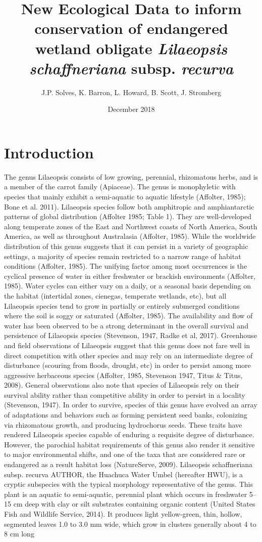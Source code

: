 \documentclass[twocolumn]{article}
\title{New Ecological Data to inform conservation of endangered wetland obligate \textit{Lilaeopsis schaffneriana} subsp. \textit{recurva}}
\author{J.P. Solves, K. Barron, L. Howard, B. Scott, J. Stromberg}
\date{December 2018}
\begin{document}
\maketitle

\section{Introduction}
The genus Lilaeopsis consists of low growing, perennial, rhizomatous herbs, and is a member of the carrot family (Apiaceae). The genus is monophyletic with species that mainly exhibit a semi-aquatic to aquatic lifestyle (Affolter, 1985); Bone et al. 2011). Lilaeopsis species follow both amphitropic and amphiantarctic patterns of global distribution (Affolter 1985; Table 1). They are well-developed along temperate zones of the East and Northwest coasts of North America, South America, as well as throughout Australasia (Affolter, 1985). While the worldwide distribution of this genus suggests that it can persist in a variety of geographic settings, a majority of species remain restricted to a narrow range of habitat conditions (Affolter, 1985). The unifying factor among most occurrences is the cyclical presence of water in either freshwater or brackish environments (Affolter, 1985). Water cycles can either vary on a daily, or a seasonal basis depending on the habitat (intertidal zones, cienegas, temperate wetlands, etc), but all Lilaeopsis species tend to grow in partially or entirely submerged conditions where the soil is soggy or saturated (Affolter, 1985). The availability and flow of water has been observed to be a strong determinant in the overall survival and persistence of Lilaeopsis species (Stevenson, 1947, Radke et al, 2017). Greenhouse and field observations of Lilaeopsis suggest that this genus does not fare well in direct competition with other species and may rely on an intermediate degree of disturbance (scouring from floods, drought, etc) in order to persist among more aggressive herbaceous species (Affolter, 1985, Stevenson 1947, Titus & Titus, 2008). General observations also note that species of Lilaeopsis rely on their survival ability rather than competitive ability in order to persist in a locality (Stevenson, 1947). In order to survive, species of this genus have evolved an array of adaptations and behaviors such as forming persistent seed banks, colonizing via rhizomatous growth, and producing hydrochorus seeds. These traits have rendered Lilaeopsis species capable of enduring a requisite degree of disturbance. However, the parochial habitat requirements of this genus also render it sensitive to major environmental shifts, and one of the taxa that are considered rare or endangered as a result habitat loss (NatureServe, 2009). Lilaeopsis schaffneriana subsp. recurva AUTHOR, the Huachuca Water Umbel (hereafter HWU), is a cryptic subspecies with the typical morphology representative of the genus. This plant is an aquatic to semi-aquatic, perennial plant which occurs in freshwater 5–15 cm deep with clay or silt substrates containing organic content (United States Fish and Wildlife Service, 2014). It produces light yellow-green, thin, hollow, segmented leaves 1.0 to 3.0 mm wide, which grow in clusters generally about 4 to 8 cm long 
\end{document}
